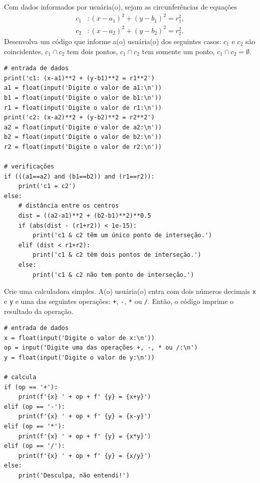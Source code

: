 \begin{exer}
  Com dados informados por usuária(o), sejam as circunferências de equações
  \begin{align}
    c_1&: (x-a_1)^2 + (y-b_1)^2 = r_1^2,\\
    c_2&: (x-a_2)^2 + (y-b_2)^2 = r_2^2.
  \end{align}
  Desenvolva um código que informe a(o) usuária(o) dos seguintes casos: $c_1$ e $c_2$ são coincidentes, $c_1\cap c_2$ tem dois pontos, $c_1\cap c_2$ tem somente um ponto, $c_1\cap c_2 = \emptyset$.
\end{exer}
\begin{resp}
\begin{lstlisting}
# entrada de dados
print('c1: (x-a1)**2 + (y-b1)**2 = r1**2')
a1 = float(input('Digite o valor de a1:\n'))
b1 = float(input('Digite o valor de b1:\n'))
r1 = float(input('Digite o valor de r1:\n'))
print('c2: (x-a2)**2 + (y-b2)**2 = r2**2')
a2 = float(input('Digite o valor de a2:\n'))
b2 = float(input('Digite o valor de b2:\n'))
r2 = float(input('Digite o valor de r2:\n'))

# verificações
if (((a1==a2) and (b1==b2)) and (r1==r2)):
    print('c1 = c2')
else:
    # distância entre os centros
    dist = ((a2-a1)**2 + (b2-b1)**2)**0.5
    if (abs(dist - (r1+r2)) < 1e-15):
        print('c1 & c2 têm um único ponto de interseção.')
    elif (dist < r1+r2):
        print('c1 & c2 têm dois pontos de interseção.')
    else:
        print('c1 & c2 não tem ponto de interseção.')
\end{lstlisting}
\end{resp}

\begin{exer}
  Crie uma calculadora simples. A(o) usuária(o) entra com dois números decimais \lstinline+x+ e \lstinline+y+ e uma das seguintes operações: \lstinline!+!, \lstinline+-+, \lstinline+*+ ou \lstinline+/+. Então, o código imprime o resultado da operação.
\end{exer}
\begin{resp}
\begin{lstlisting}
# entrada de dados
x = float(input('Digite o valor de x:\n'))
op = input('Digite uma das operações +, -, * ou /:\n')
y = float(input('Digite o valor de y:\n'))

# calcula
if (op == '+'):
    print(f'{x} ' + op + f' {y} = {x+y}')
elif (op == '-'):
    print(f'{x} ' + op + f' {y} = {x-y}')
elif (op == '*'):
    print(f'{x} ' + op + f' {y} = {x*y}')
elif (op == '/'):
    print(f'{x} ' + op + f' {y} = {x/y}')
else:
    print('Desculpa, não entendi!')
\end{lstlisting}
\end{resp}

